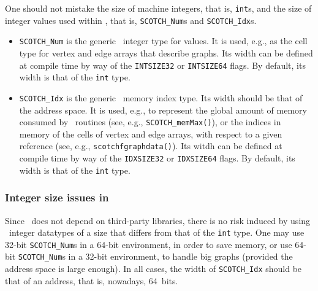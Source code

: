 One should not mistake the size of machine integers, that is,
\texttt{int}s, and the size of integer values used within \scotch,
that is, \texttt{SCOTCH\_Num}s and \texttt{SCOTCH\_Idx}s.
\begin{itemize}
\item
  \texttt{SCOTCH\_Num} is the generic \scotch\ integer type for
  values. It is used, e.g., as the cell type for vertex and edge
  arrays that describe graphs. Its width can be defined at compile
  time by way of the \texttt{INTSIZE32} or \texttt{INTSIZE64}
  flags. By default, its width is that of the \texttt{int} type.
\item
  \texttt{SCOTCH\_Idx} is the generic \scotch\ memory index type. Its
  width should be that of the address space. It is used, e.g., to
  represent the global amount of memory consumed by \scotch\ routines
  (see, e.g., \texttt{SCOTCH\_\lbt memMax()}), or the indices in
  memory of the cells of vertex and edge arrays, with respect to a
  given reference (see, e.g., \texttt{scotchf\lbt graph\lbt data()}).
  Its witdh can be defined at compile time by way of the
  \texttt{IDXSIZE32} or \texttt{IDXSIZE64} flags. By default, its
  width is that of the \texttt{int} type.
\end{itemize}

\subsubsection{Integer size issues in \scotch}

Since \scotch\ does not depend on third-party libraries, there is no
risk induced by using \scotch\ integer datatypes of a size that differs
from that of the \texttt{int} type. One may use 32-bit
\texttt{SCOTCH\_\lbt Num}s in a 64-bit environment, in order to save
memory, or use 64-bit \texttt{SCOTCH\_\lbt Num}s in a 32-bit
environment, to handle big graphs (provided the address space is large
enough). In all cases, the width of \texttt{SCOTCH\_\lbt Idx} should
be that of an address, that is, nowadays, 64~bits.

\begin{center}
\end{center}

